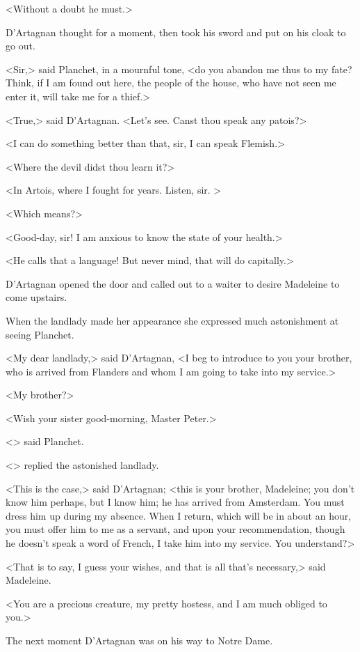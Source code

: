 <Without a doubt he must.>

D'Artagnan thought for a moment, then took his sword and put on his cloak to go out.

<Sir,> said Planchet, in a mournful tone, <do you abandon me thus to my fate? Think, if I am found out here, the people of the house, who have not seen me enter it, will take me for a thief.>

<True,> said D'Artagnan. <Let's see. Canst thou speak any patois?>

<I can do something better than that, sir, I can speak Flemish.>

<Where the devil didst thou learn it?>

<In Artois, where I fought for years. Listen, sir. >

<Which means?>

<Good-day, sir! I am anxious to know the state of your health.>

<He calls that a language! But never mind, that will do capitally.>

D'Artagnan opened the door and called out to a waiter to desire Madeleine to come upstairs.

When the landlady made her appearance she expressed much astonishment at seeing Planchet.

<My dear landlady,> said D'Artagnan, <I beg to introduce to you your brother, who is arrived from Flanders and whom I am going to take into my service.>

<My brother?>

<Wish your sister good-morning, Master Peter.>

<> said Planchet.

<> replied the astonished landlady.

<This is the case,> said D'Artagnan; <this is your brother, Madeleine; you don't know him perhaps, but I know him; he has arrived from Amsterdam. You must dress him up during my absence. When I return, which will be in about an hour, you must offer him to me as a servant, and upon your recommendation, though he doesn't speak a word of French, I take him into my service. You understand?>

<That is to say, I guess your wishes, and that is all that's necessary,> said Madeleine.

<You are a precious creature, my pretty hostess, and I am much obliged to you.>

The next moment D'Artagnan was on his way to Notre Dame.